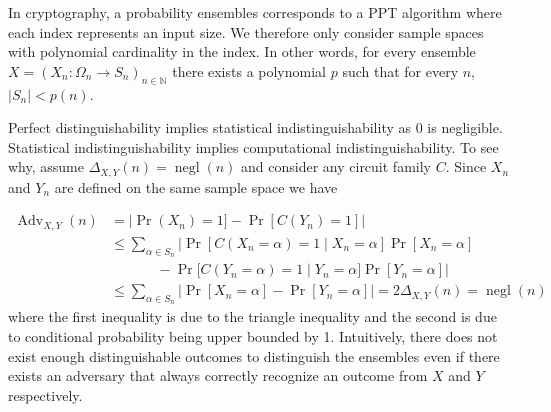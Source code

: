 In cryptography, a probability ensembles corresponds to a PPT algorithm where each index represents an input size. We therefore only consider sample spaces with polynomial cardinality in the index. In other words, for every ensemble $X = (X_n \colon \Omega_n \to S_n)_{n \in \mathbb{N}}$ there exists a polynomial $p$ such that for every $n$, $|S_n| < p(n)$.

Perfect distinguishability implies statistical indistinguishability as 0 is negligible. Statistical indistinguishability implies computational indistinguishability. To see why, assume $\Delta_{X,Y}(n) = \operatorname{negl}(n)$ and consider any circuit family $C$. Since $X_n$ and $Y_n$ are defined on the same sample space we have

\begin{equation*}
\begin{aligned}
    \operatorname{Adv}_{X,Y}(n) &= |\operatorname{Pr}(X_n) = 1] - \operatorname{Pr}[C(Y_n) = 1]|\\
        &\leq \sum_{\alpha \in S_n} | \operatorname{Pr}[C(X_n = \alpha) = 1 \; | \; X_n = \alpha]\operatorname{Pr}[X_n = \alpha] \\
        &\phantom{=} \qquad - \operatorname{Pr}[C(Y_n = \alpha) = 1 \; | \; Y_n = \alpha]\operatorname{Pr}[Y_n = \alpha] | \\
        &\leq \sum_{\alpha \in S_n} | \operatorname{Pr}[X_n = \alpha] - \operatorname{Pr}[Y_n = \alpha]| = 2\Delta_{X,Y}(n) = \operatorname{negl}(n)
\end{aligned}
\end{equation*}
where the first inequality is due to the triangle inequality and the second is due to conditional probability being upper bounded by 1. Intuitively, there does not exist enough distinguishable outcomes to distinguish the ensembles even if there exists an adversary that always correctly recognize an outcome from $X$ and $Y$ respectively.

